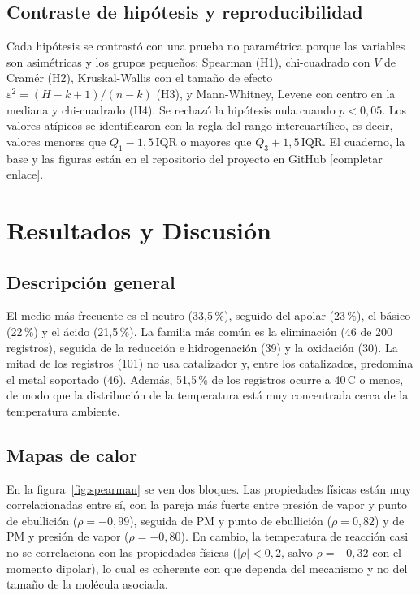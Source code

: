 \documentclass[twoside,twocolumn,10pt]{article}
\begin{document}
\subsection{Contraste de hip\'otesis y reproducibilidad}
Cada hip\'otesis se contrast\'o con una prueba no param\'etrica porque las variables son asim\'etricas y los grupos peque\~nos: Spearman (H1), chi-cuadrado con $V$ de Cram\'er (H2), Kruskal-Wallis con el tama\~no de efecto $\varepsilon^2=(H-k+1)/(n-k)$ \cite{Tomczak2014} (H3), y Mann-Whitney, Levene con centro en la mediana \cite{Brown1974} y chi-cuadrado (H4). Se rechaz\'o la hip\'otesis nula cuando $p<0{,}05$. Los valores at\'ipicos se identificaron con la regla del rango intercuart\'ilico, es decir, valores menores que $Q_1-1{,}5\,\mathrm{IQR}$ o mayores que $Q_3+1{,}5\,\mathrm{IQR}$. El cuaderno, la base y las figuras est\'an en el repositorio del proyecto en GitHub [completar enlace].

\section{Resultados y Discusión}
\subsection{Descripci\'on general}
El medio m\'as frecuente es el neutro (33,5\,\%), seguido del apolar (23\,\%), el b\'asico (22\,\%) y el \'acido (21,5\,\%). La familia m\'as com\'un es la eliminaci\'on (46 de 200 registros), seguida de la reducci\'on e hidrogenaci\'on (39) y la oxidaci\'on (30). La mitad de los registros (101) no usa catalizador y, entre los catalizados, predomina el metal soportado (46). Adem\'as, 51,5\,\% de los registros ocurre a 40\,\textdegree C o menos, de modo que la distribuci\'on de la temperatura est\'a muy concentrada cerca de la temperatura ambiente.

\subsection{Mapas de calor}
En la figura~\ref{fig:spearman} se ven dos bloques. Las propiedades f\'isicas est\'an muy correlacionadas entre s\'i, con la pareja m\'as fuerte entre presi\'on de vapor y punto de ebullici\'on ($\rho=-0{,}99$), seguida de PM y punto de ebullici\'on ($\rho=0{,}82$) y de PM y presi\'on de vapor ($\rho=-0{,}80$). En cambio, la temperatura de reacci\'on casi no se correlaciona con las propiedades f\'isicas ($|\rho|<0{,}2$, salvo $\rho=-0{,}32$ con el momento dipolar), lo cual es coherente con que dependa del mecanismo y no del tama\~no de la mol\'ecula asociada.
\end{document}
